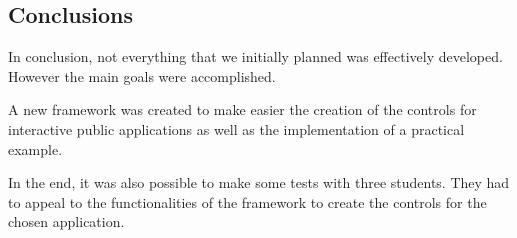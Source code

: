 \documentclass[9pt,a4paper]{extarticle}
\begin{document}
\begin{multicols}{2}
\section{Conclusions}\label{sec:conclui}

In conclusion, not everything that we initially planned was effectively developed. However the main goals were accomplished.

A new framework was created to make easier the creation of the controls for interactive public applications as well as the implementation of a practical example.

In the end, it was also possible to make some tests with three students. They had to appeal to the functionalities of the framework to create the controls for the chosen application.



\end{multicols}
\end{document}
